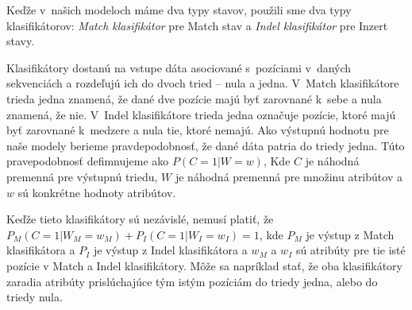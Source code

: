 
Keďže v~našich modeloch máme dva typy stavov, použili sme dva typy klasifikátorov: \textit{Match klasifikátor} pre Match stav a \textit{Indel klasifikátor} pre Inzert stavy.

Klasifikátory dostanú na vstupe dáta asociované s~pozíciami v~daných sekvenciách a rozdeľujú ich do dvoch tried -- nula a jedna. V~Match klasifikátore trieda jedna znamená, že dané dve pozície majú byť zarovnané k~sebe a nula znamená, že nie. V~Indel klasifikátore trieda jedna označuje pozície, ktoré majú byť zarovnané k~medzere a nula tie, ktoré nemajú. Ako výstupnú hodnotu pre naše modely berieme pravdepodobnosť, že dané dáta patria do triedy jedna. Túto pravepodobnosť defimnujeme ako $P(C=1|W=w)$, Kde $C$ je náhodná premenná pre výstupnú triedu, $W$ je náhodná premenná pre množinu atribútov a $w$ sú konkrétne hodnoty atribútov.

Keďže tieto klasifikátory sú nezávislé, nemusí platiť, že $P_M(C=1|W_M=w_M) + P_I(C=1|W_I=w_I) = 1$, kde $P_M$ je výstup z Match klasifikátora a $P_I$ je výstup z Indel klasifikátora a $w_M$ a $w_I$ sú atribúty pre tie isté pozície v Match a Indel klasifikátory. Môže sa napríklad stať, že oba klasifikátory zaradia atribúty prislúchajúce tým istým pozíciám do triedy jedna, alebo do triedy nula.

